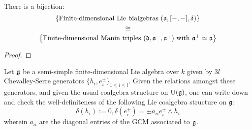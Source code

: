         \begin{proposition} \label{prop: manin_triples_classify_lie_bialgebras}
            There is a bijection:
                $$\left\{ \text{Finite-dimensional Lie bialgebras $(\mathfrak{a}, [-, -], \delta)$} \right\}$$
                $$\cong$$
                $$\left\{ \text{Finite-dimensional Manin triples $(\mathfrak{d}, \mathfrak{a}^-, \mathfrak{a}^+)$ with $\mathfrak{a}^+ \simeq \mathfrak{a}$} \right\}$$
        \end{proposition}
            \begin{proof}
                 
            \end{proof}
        \begin{example}
            Let $\mathfrak{g}$ be a semi-simple finite-dimensional Lie algebra over $k$ given by $3l$ Chevalley-Serre generators $\{h_i, e_i^{\pm}\}_{1 \leq i \leq l}$. Given the relations amongst these generators, and given the usual coalgebra structure on $\mathrm{U}(\mathfrak{g})$, one can write down and check the well-definiteness of the following Lie coalgebra structure on $\mathfrak{g}$:
                $$\delta(h_i) := 0, \delta(e_i^{\pm}) = \pm a_{ii} e_i^{\pm} \wedge h_i$$
            wherein $a_{ii}$ are the diagonal entries of the GCM associated to $\mathfrak{g}$. 
        \end{example}
        
